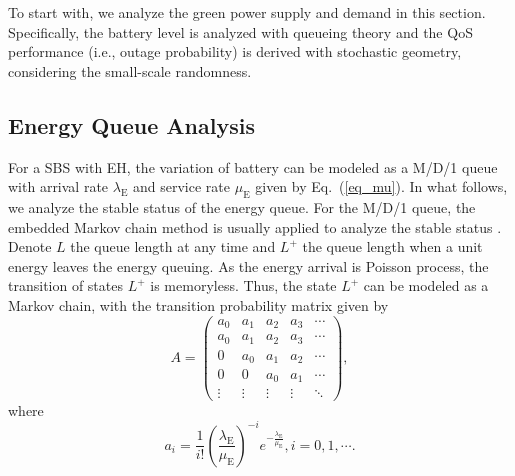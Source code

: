 \documentclass[12pt, draftclsnofoot,onecolumn]{IEEEtran}
\begin{document}
To start with, we analyze the green power supply and demand in this section.
Specifically, the battery level is analyzed with queueing theory and the QoS performance (i.e., outage probability) is derived with stochastic geometry, considering the small-scale randomness.
 

\subsection{Energy Queue Analysis}
For a SBS with EH, the variation of battery can be modeled as a M/D/1 queue with arrival rate $\lambda_\mathrm{E}$ and service rate $\mu_\mathrm{E}$ given by Eq.~(\ref{eq_mu}).
In what follows, we analyze the stable status of the energy queue.
For the M/D/1 queue, the embedded Markov chain method is usually applied to analyze the stable status \cite{MD1_queue}.
Denote $L$ the queue length at any time and $L^+$ the queue length when a unit energy leaves the energy queuing.
As the energy arrival is Poisson process, the transition of states $L^+$ is memoryless.
Thus, the state $L^+$ can be modeled as a Markov chain, with the transition probability matrix given by
\begin{equation}\label{eq_MD1_transition_matrix}
     A = \left( \begin{array}{ccccc} a_0 & a_1 & a_2 & a_3 & \cdots \\ a_0 & a_1 & a_2 & a_3 & \cdots \\ 0 & a_0 & a_1 & a_2 & \cdots \\ 0 & 0& a_0 & a_1 & \cdots \\ \vdots & \vdots & \vdots & \vdots & \ddots \end{array} \right) ,
\end{equation}
where
\begin{equation}\label{eq_MD1_a}
    a_i = \frac{1}{i!} \left(\frac{\lambda_\mathrm{E}}{\mu_\mathrm{E}}\right)^{-i} e^{-\frac{\lambda_\mathrm{E}}{\mu_\mathrm{E}}}, i = 0,1,\cdots .
\end{equation}
\end{document}
